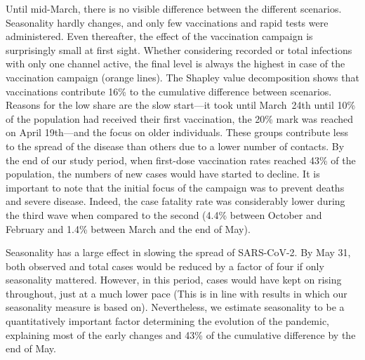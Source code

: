 \documentclass[12pt]{article}
\begin{document}
\begin{figure}[!tp]
\end{figure}

Until mid-March, there is no visible difference between the different scenarios.
Seasonality hardly changes, and only few vaccinations and rapid tests were administered.
Even thereafter, the effect of the vaccination campaign is surprisingly small at first
sight. Whether considering recorded or total infections with only one channel active,
the final level is always the highest in case of the vaccination campaign (orange
lines). The Shapley value decomposition shows that vaccinations contribute 16\% to the
cumulative difference between scenarios. Reasons for the low share are the slow
start---it took until March~24th until 10\% of the population had received their first
vaccination, the 20\% mark was reached on April 19th---and the focus on older
individuals. These groups contribute less to the spread of the disease than others due
to a lower number of contacts. By the end of our study period, when first-dose
vaccination rates reached 43\% of the population, the numbers of new cases would have
started to decline. It is important to note that the initial focus of the campaign was
to prevent deaths and severe disease. Indeed, the case fatality rate was considerably
lower during the third wave when compared to the second (4.4\% between October and
February and 1.4\% between March and the end of May).

Seasonality has a large effect in slowing the spread of SARS-CoV-2. By May 31, both
observed and total cases would be reduced by a factor of four if only seasonality
mattered. However, in this period, cases would have kept on rising throughout, just at a
much lower pace (This is in line with results in \cite{Gavenciak2021} which our
seasonality measure is based on). Nevertheless, we estimate seasonality to be a
quantitatively important factor determining the evolution of the pandemic, explaining
most of the early changes and 43\% of the cumulative difference by the end of May.
\end{document}
